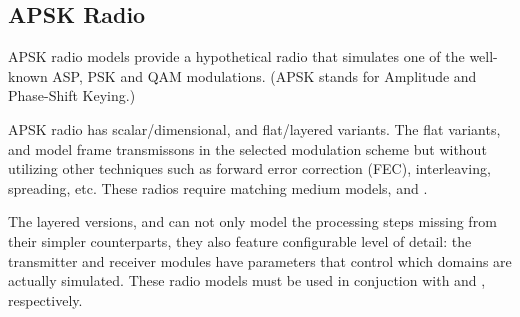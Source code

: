 \subsection{APSK Radio}
\label{sec:phy:apsk-radio}

APSK radio models provide a hypothetical radio that simulates
one of the well-known ASP, PSK and QAM modulations.
(APSK stands for Amplitude and Phase-Shift Keying.)

APSK radio has scalar/dimensional, and flat/layered variants.
The flat variants,  and 
model frame transmissons in the selected modulation scheme
but without utilizing other techniques such as forward error
correction (FEC), interleaving, spreading, etc. These radios
require matching medium models, 
and .

The layered versions, 
and  can not only
model the processing steps missing from their simpler counterparts,
they also feature configurable level of detail: the transmitter
and receiver modules have  parameters that
control which domains are actually simulated.
These radio models must be used in conjuction with
 and
, respectively.




